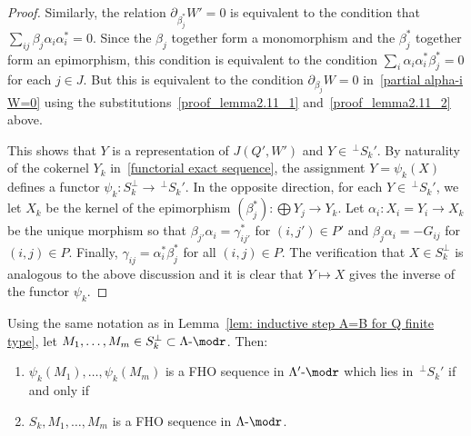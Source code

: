 \begin{proof}
Similarly, the relation $\partial_{\beta_j^\ast}W'=0$ is equivalent to the condition that $\sum_{ij} \beta_j\alpha_i\alpha_i^\ast=0$. Since the $\beta_j$ together form a monomorphism and the $\beta_j^\ast$ together form an epimorphism, this condition is equivalent to the condition $\sum_i \alpha_i\alpha_i^\ast\beta_j^\ast=0$ for each $j\in J$. But this is equivalent to the condition $\partial_{\beta_j}W=0$ in~\eqref{partial alpha-i W=0} using the substitutions~\eqref{proof_lemma2.11_1}  and~\eqref{proof_lemma2.11_2} above.

This shows that $Y$ is a representation of $J(Q',W')$ and $Y\in \,^{\perp}S_k'$. By naturality of the cokernel $Y_k$ in~\eqref{functorial exact sequence}, the assignment $Y=\psi_k(X)$ defines a functor $\psi_k:S_k^\perp\to \,^{\perp}S_k'$. In the opposite direction, for each $Y\in\,^{\perp}S_k'$, we let $X_k$ be the kernel of the epimorphism $(\beta_j^\ast):\bigoplus Y_j\to Y_k$. Let $\alpha_i:X_i=Y_i\to X_k$ be the unique morphism so that $\beta_{j'}\alpha_i=\gamma_{ij'}^\ast$ for $(i,j')\in P'$ and $\beta_j\alpha_i=-G_{ij}$ for $(i,j)\in P$. Finally, $\gamma_{ij}=\alpha_i^\ast\beta_j^\ast$ for all $(i,j)\in P$. The verification that $X\in S_k^\perp$ is analogous to the above discussion and it is clear that $Y\mapsto X$ gives the inverse of the functor $\psi_k$.
\end{proof}



\begin{lemm}\label{lem: rotation lemma for modules}
Using the same notation as in Lemma~\ref{lem: inductive step A=B for Q finite type}, let $M_1,\ldots,M_m\in S_k^\perp\subset \Lambda\text{-}\modr $. Then: 
\begin{enumerate}
\item\label{lemma2.12_1} %
$\psi_k(M_1),\ldots,\psi_k(M_m)$ is a FHO sequence in $\Lambda'\text{-}\modr $ which lies in $\,^{\perp}S_k'$ if and only if 
\item\label{lemma2.12_2} %
$S_k,M_1,\ldots,M_m$ is a FHO sequence in $\Lambda\text{-}\modr $.
\end{enumerate}
\end{lemm}

